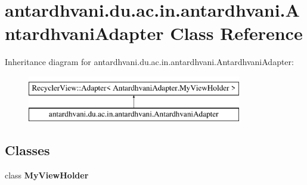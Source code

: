 \hypertarget{classantardhvani_1_1du_1_1ac_1_1in_1_1antardhvani_1_1_antardhvani_adapter}{}\section{antardhvani.\+du.\+ac.\+in.\+antardhvani.\+Antardhvani\+Adapter Class Reference}
\label{classantardhvani_1_1du_1_1ac_1_1in_1_1antardhvani_1_1_antardhvani_adapter}
Inheritance diagram for antardhvani.\+du.\+ac.\+in.\+antardhvani.\+Antardhvani\+Adapter\+:\begin{figure}[H]
\begin{center}
\leavevmode
\includegraphics[height=2.000000cm]{classantardhvani_1_1du_1_1ac_1_1in_1_1antardhvani_1_1_antardhvani_adapter}
\end{center}
\end{figure}
\subsection*{Classes}
\begin{DoxyCompactItemize}
\item 
class {\bfseries My\+View\+Holder}
\end{DoxyCompactItemize}
